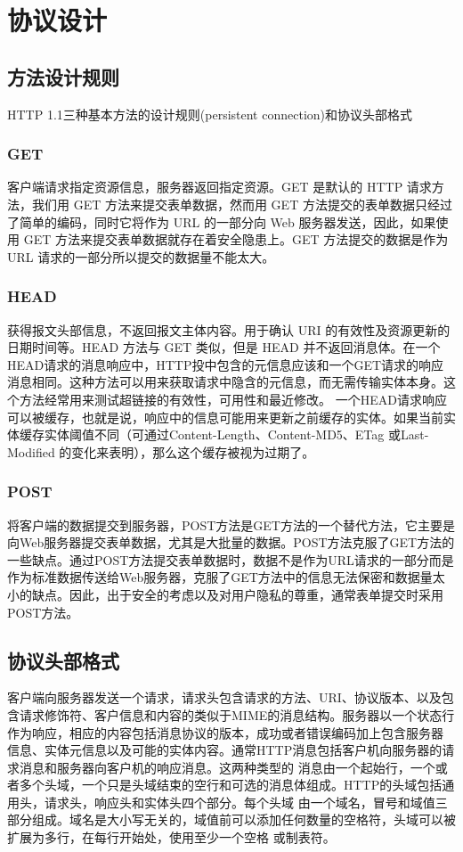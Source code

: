 \chapter{协议设计}

\section{方法设计规则}
HTTP 1.1三种基本方法的设计规则(persistent connection)和协议头部格式
\subsection{GET}
客户端请求指定资源信息，服务器返回指定资源。GET 是默认的 HTTP 请求方法，我们用 GET 方法来提交表单数据，然而用 GET 方法提交的表单数据只经过了简单的编码，同时它将作为 URL 的一部分向 Web 服务器发送，因此，如果使用 GET 方法来提交表单数据就存在着安全隐患上。GET 方法提交的数据是作为 URL 请求的一部分所以提交的数据量不能太大。

\subsection{HEAD}
获得报文头部信息，不返回报文主体内容。用于确认 URI 的有效性及资源更新的日期时间等。HEAD 方法与 GET 类似，但是 HEAD 并不返回消息体。在一个HEAD请求的消息响应中，HTTP投中包含的元信息应该和一个GET请求的响应消息相同。这种方法可以用来获取请求中隐含的元信息，而无需传输实体本身。这个方法经常用来测试超链接的有效性，可用性和最近修改。 一个HEAD请求响应可以被缓存，也就是说，响应中的信息可能用来更新之前缓存的实体。如果当前实体缓存实体阈值不同（可通过Content-Length、Content-MD5、ETag 或Last-Modified 的变化来表明），那么这个缓存被视为过期了。

\subsection{POST}
将客户端的数据提交到服务器，POST方法是GET方法的一个替代方法，它主要是向Web服务器提交表单数据，尤其是大批量的数据。POST方法克服了GET方法的一些缺点。通过POST方法提交表单数据时，数据不是作为URL请求的一部分而是作为标准数据传送给Web服务器，克服了GET方法中的信息无法保密和数据量太小的缺点。因此，出于安全的考虑以及对用户隐私的尊重，通常表单提交时采用POST方法。


\section{协议头部格式}
客户端向服务器发送一个请求，请求头包含请求的方法、URI、协议版本、以及包 含请求修饰符、客户信息和内容的类似于MIME的消息结构。服务器以一个状态行作为响应，相应的内容包括消息协议的版本，成功或者错误编码加上包含服务器 信息、实体元信息以及可能的实体内容。通常HTTP消息包括客户机向服务器的请求消息和服务器向客户机的响应消息。这两种类型的 消息由一个起始行，一个或者多个头域，一个只是头域结束的空行和可选的消息体组成。HTTP的头域包括通用头，请求头，响应头和实体头四个部分。每个头域 由一个域名，冒号和域值三部分组成。域名是大小写无关的，域值前可以添加任何数量的空格符，头域可以被扩展为多行，在每行开始处，使用至少一个空格 或制表符。

